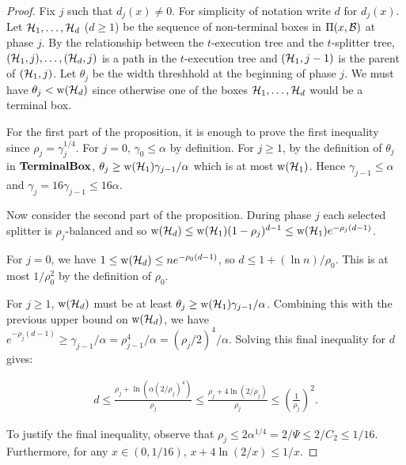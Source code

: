 \documentclass{acmsmall}
\newcommand{\cB}{{\cal B}}
\newcommand{\cH}{{\cal H}}
\newcommand{\terminalbox}{{\rm{\bf TerminalBox}}}
\newcommand{\width}{{\bf {\rm  w}}}
\newcommand{\gridprec}{\alpha}
\newcommand{\errorcont}{\Psi}
\begin{document}
\begin{proof} Fix $j$ such that $d_j(x) \neq 0$. 
For simplicity of notation write $d$ for $d_j(x)$.
Let $\cH_1,\ldots,\cH_{d}$ ($d \geq 1$) be the sequence of non-terminal boxes in $\Pi(x,\cB)$ at
phase $j$.  By the relationship between the $t$-execution tree and the $t$-splitter tree,
$(\cH_1,j),\ldots,(\cH_d,j)$ is  a path in the $t$-execution tree and $(\cH_1,j-1)$ is the
parent of $(\cH_1,j)$.   Let $\theta_j$ be the width threshhold at the beginning of phase $j$.
We must have $\theta_j < \width(\cH_d)$ since otherwise one of the boxes $\cH_1,\ldots,\cH_d$ would
be a terminal box.

For the first part of the proposition, it is enough to prove the first inequality since
$\rho_j=\gamma_j^{1/4}$. 
For $j=0$, $\gamma_0 \leq \gridprec$ by definition.
For $j \geq 1$, by the definition of $\theta_j$ in $\terminalbox$,
$\theta_j \geq \width(\cH_1)\gamma_{j-1}/\gridprec$ which 
is at most $\width(\cH_1)$. Hence $\gamma_{j-1} \leq \gridprec$ and $\gamma_j =16 \gamma_{j-1} \leq 16 \gridprec$.

Now consider the second part of the proposition.
During phase $j$ each selected splitter is $\rho_j$-balanced and so $\width(\cH_d) \leq \width(\cH_1)(1-\rho_j)^{d-1} \leq \width(\cH_1)e^{-\rho_j(d-1)}$.

For $j=0$, we have $1 \leq \width(\cH_d) \leq n e^{-\rho_0(d-1)}$, so $d \leq 1 + (\ln n)/\rho_0$. 
This is at most $1/\rho_0^2$ by the definition of $\rho_0$. 

For $j \geq 1$, $\width(\cH_d)$
must be at least $\theta_j \geq \width(\cH_1) \gamma_{j-1}/\gridprec$.  Combining this with the
previous upper bound on $\width(\cH_d)$, we have
$e^{-\rho_j(d-1)} \geq \gamma_{j-1}/\gridprec = \rho_{j-1}^4/\gridprec = (\rho_j/2)^4/\gridprec$.  Solving this
final inequality for $d$ gives:
 
\begin{eqnarray*}
d \leq \frac{\rho_j+\ln (\gridprec(2/\rho_j)^4)}{\rho_j} \leq \frac{\rho_j + 4\ln(2/\rho_j)}{\rho_j} 
\leq \left(\frac{1}{\rho_j}\right)^2.
\end{eqnarray*}

To justify the final inequality, observe that $\rho_j \leq 2\gridprec^{1/4} =2/\errorcont \leq 2/C_2 \leq 1/16$.
Furthermore, for any $x \in (0,1/16)$, 
$x+4\ln(2/x) \leq 1/x$.
\end{proof}
\end{document}
